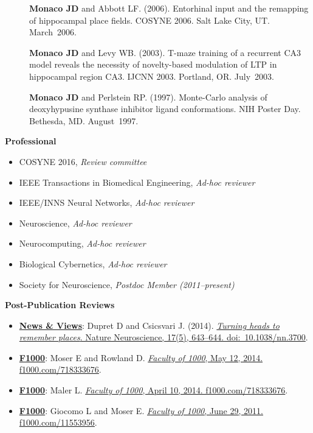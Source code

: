 \documentclass[10pt]{article}
\begin{document}
\begin{description}
\item[\quad] \textbf{Monaco JD} and Abbott LF. (2006). Entorhinal input and the remapping of hippocampal place fields. COSYNE 2006. Salt Lake City, UT. March~2006.
\item[\quad] \textbf{Monaco JD} and Levy WB. (2003). T-maze training of a recurrent CA3 model reveals the necessity of novelty-based modulation of LTP in hippocampal region CA3. IJCNN 2003. Portland, OR. July~2003.
\item[\quad] \textbf{Monaco JD} and Perlstein RP. (1997). Monte-Carlo analysis of deoxyhypusine synthase inhibitor ligand conformations. NIH Poster Day. Bethesda, MD. August~1997. 
\end{description}

{\large \textbf{Professional}}
\begin{itemize}
  \item COSYNE 2016, \emph{Review committee}
  \item IEEE Transactions in Biomedical Engineering, \emph{Ad-hoc reviewer}
  \item IEEE/INNS Neural Networks, \emph{Ad-hoc reviewer}
  \item Neuroscience, \emph{Ad-hoc reviewer}
  \item Neurocomputing, \emph{Ad-hoc reviewer}
  \item Biological Cybernetics, \emph{Ad-hoc reviewer}
  \item Society for Neuroscience, \emph{Postdoc Member (2011--present)}
\end{itemize}
  
{\large \textbf{Post-Publication Reviews}}
\begin{itemize}
  \item \underline{\bf News \& Views}: Dupret D and Csicsvari J. (2014). \href{http://dx.doi.org/10.1038/nn.3700}{\emph{Turning heads to remember places}. Nature Neuroscience, 17(5), 643--644. doi:~10.1038/nn.3700}.
  \item \underline{\bf F1000}: Moser E and Rowland D. \href{http://f1000prime.com/718333676#eval793494783}{\emph{Faculty of 1000}, May 12, 2014. f1000.com/718333676}.
  \item \underline{\bf F1000}: Maler L. \href{http://f1000prime.com/718333676#eval793493493}{\emph{Faculty of 1000}, April 10, 2014. f1000.com/718333676}.
  \item \underline{\bf F1000}: Giocomo L and Moser E. \href{http://f1000.com/11553956}{\emph{Faculty of 1000}, June 29, 2011. f1000.com/11553956}.
\end{itemize}
\end{document}
